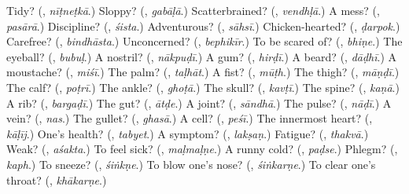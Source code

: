 \begin{tcolorbox}[breakable,colback=teal!4,colframe=teal!35!black,title={Before you move on}]
Tidy? (\textbf{}, \emph{nīṭneṭkā}.) Sloppy? (\textbf{}, \emph{gabāḷā}.) Scatterbrained? (\textbf{}, \emph{vendhḷā}.) A mess? (\textbf{}, \emph{pasārā}.) Discipline? (\textbf{}, \emph{śista}.) Adventurous? (\textbf{}, \emph{sāhsī}.) Chicken-hearted? (\textbf{}, \emph{ḍarpok}.) Carefree? (\textbf{}, \emph{bindhāsta}.) Unconcerned? (\textbf{}, \emph{bephikīr}.) To be scared of? (\textbf{}, \emph{bhiṇe}.) The eyeball? (\textbf{}, \emph{bubuḷ}.) A nostril? (\textbf{}, \emph{nākpuḍī}.) A gum? (\textbf{}, \emph{hirḍī}.) A beard? (\textbf{}, \emph{dāḍhī}.) A moustache? (\textbf{}, \emph{miśī}.) The palm? (\textbf{}, \emph{taḷhāt}.) A fist? (\textbf{}, \emph{mūṭh}.) The thigh? (\textbf{}, \emph{māṇḍī}.) The calf? (\textbf{}, \emph{poṭrī}.) The ankle? (\textbf{}, \emph{ghoṭā}.) The skull? (\textbf{}, \emph{kavṭī}.) The spine? (\textbf{}, \emph{kaṇā}.) A rib? (\textbf{}, \emph{bargaḍī}.) The gut? (\textbf{}, \emph{ātḍe}.) A joint? (\textbf{}, \emph{sāndhā}.) The pulse? (\textbf{}, \emph{nāḍī}.) A vein? (\textbf{}, \emph{nas}.) The gullet? (\textbf{}, \emph{ghasā}.) A cell? (\textbf{}, \emph{peśī}.) The innermost heart? (\textbf{}, \emph{kāḷīj}.) One's health? (\textbf{}, \emph{tabyet}.) A symptom? (\textbf{}, \emph{lakṣaṇ}.) Fatigue? (\textbf{}, \emph{thakvā}.) Weak? (\textbf{}, \emph{aśakta}.) To feel sick? (\textbf{}, \emph{maḷmaḷṇe}.) A runny cold? (\textbf{}, \emph{paḍse}.) Phlegm? (\textbf{}, \emph{kaph}.) To sneeze? (\textbf{}, \emph{śiṅkṇe}.) To blow one's nose? (\textbf{}, \emph{śiṅkarṇe}.) To clear one's throat? (\textbf{}, \emph{khākarṇe}.)
\end{tcolorbox}
